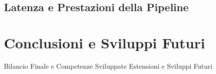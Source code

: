 \documentclass[a4paper,12pt]{report}
\begin{document}
\section{Latenza e Prestazioni della Pipeline}



\chapter*{Conclusioni e Sviluppi Futuri}

Bilancio Finale e Competenze Sviluppate
Estensioni e Sviluppi Futuri
\end{document}
